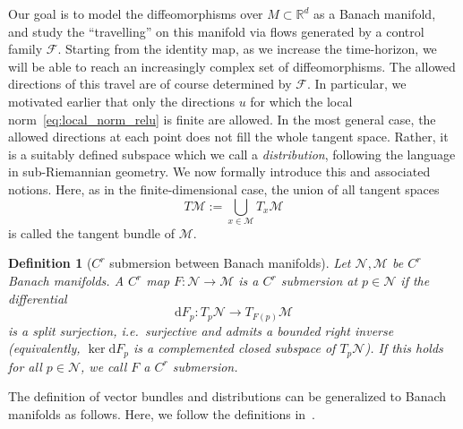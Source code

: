 \documentclass[12pt]{amsart}
\numberwithin{equation}{section}
\newtheorem{definition}{Definition}[section]
\theoremstyle{remark}
\begin{document}
Our goal is to model the diffeomorphisms over $M \subset \mathbb R^d$ as a Banach manifold, and study the ``travelling'' on this manifold via flows generated by a control family $\mathcal F$. Starting from the identity map, as we increase the time-horizon, we will be able to reach an increasingly complex set of diffeomorphisms.
The allowed directions of this travel are of course determined by $\mathcal F$.
In particular, we motivated earlier that only the directions $u$ for which the local norm~\eqref{eq:local_norm_relu}
is finite are allowed.
In the most general case, the allowed directions at each point does not fill the whole tangent space.
Rather, it is a suitably defined subspace which we call a \emph{distribution},
following the language in sub-Riemannian geometry.
We now formally introduce this and associated notions.
Here, as in the finite-dimensional case, the union of all tangent spaces
\begin{equation}
    T\mathcal M:=\bigcup_{x\in \mathcal M} T_x \mathcal M
\end{equation}
is called the tangent bundle of $\mathcal M$.

\begin{definition}[$C^r$ submersion between Banach manifolds]
\label{def:banach_submersion}
Let $\mathcal N,\mathcal M$ be $C^r$ Banach manifolds. A $C^r$ map $F:\mathcal N\to\mathcal M$ is a \emph{$C^r$ submersion at $p\in \mathcal N$} if the differential
\begin{equation}
\mathrm dF_p:T_p\mathcal N\to T_{F(p)}\mathcal M
\end{equation}
is a split surjection, i.e.\ surjective and admits a bounded right inverse (equivalently, $\ker \mathrm dF_p$ is a complemented closed subspace of $T_p\mathcal N$). If this holds for all $p\in \mathcal N$, we call $F$ a $C^r$ submersion.
\end{definition}

The definition of vector bundles and distributions can be generalized to Banach manifolds as follows.
Here, we follow the definitions in~\cite{arguillere2020sub}.
\end{document}
